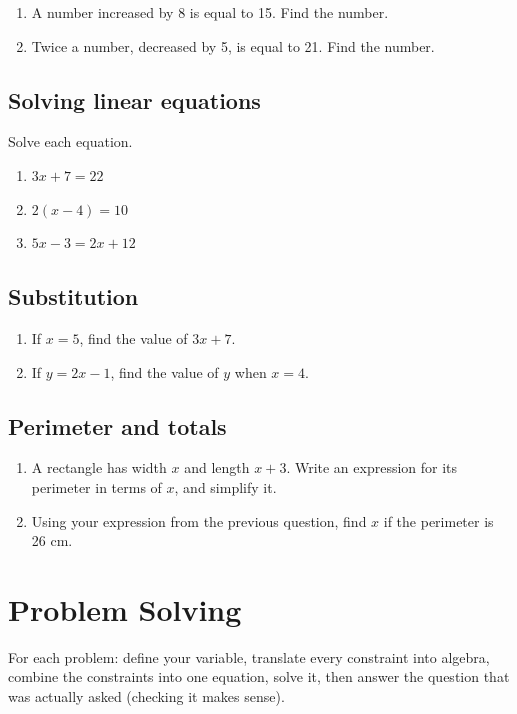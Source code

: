 \documentclass[11pt]{article}
\newcommand{\qspace}{\vspace{1.0cm}}
\begin{document}
\begin{enumerate}[resume]
  \item A number increased by 8 is equal to 15. Find the number.
  \qspace
  \item Twice a number, decreased by 5, is equal to 21. Find the number.
  \qspace
\end{enumerate}

\subsection*{Solving linear equations}
Solve each equation.

\begin{enumerate}[resume]
  \item $3x + 7 = 22$
  \qspace
  \item $2(x - 4) = 10$
  \qspace
  \item $5x - 3 = 2x + 12$
  \qspace
\end{enumerate}

\subsection*{Substitution}
\begin{enumerate}[resume]
  \item If $x = 5$, find the value of $3x + 7$.
  \qspace
  \item If $y = 2x - 1$, find the value of $y$ when $x = 4$.
  \qspace
\end{enumerate}

\subsection*{Perimeter and totals}
\begin{enumerate}[resume]
  \item A rectangle has width $x$ and length $x + 3$. Write an expression for its perimeter in terms of $x$, and simplify it.
  \qspace
  \item Using your expression from the previous question, find $x$ if the perimeter is 26 cm.
  \qspace
\end{enumerate}

\newpage
\section{Problem Solving}

\noindent For each problem: define your variable, translate every constraint into algebra, combine the constraints into one equation, solve it, then answer the question that was actually asked (checking it makes sense).
\end{document}
